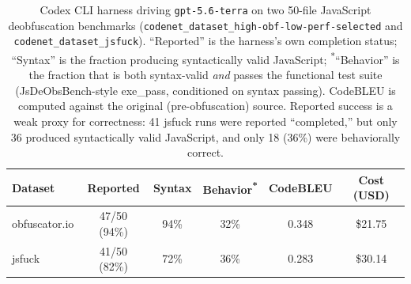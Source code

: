 
\begin{table}[h]
  \centering
  \small
  \begin{tabular}{lccccc}
    \toprule
    Dataset & Reported & Syntax & Behavior\textsuperscript{*} & CodeBLEU & Cost (USD) \\
    \midrule
    obfuscator.io & 47/50 (94\%) & 94\% & 32\% & 0.348 & \$21.75 \\
    jsfuck        & 41/50 (82\%) & 72\% & 36\% & 0.283 & \$30.14 \\
    \bottomrule
  \end{tabular}
  \caption{%
    Codex CLI harness driving \texttt{gpt-5.6-terra} on two 50-file JavaScript
    deobfuscation benchmarks (\texttt{codenet\_dataset\_high-obf-low-perf-selected}
    and \texttt{codenet\_dataset\_jsfuck}). ``Reported'' is the harness's own
    completion status; ``Syntax'' is the fraction producing syntactically valid
    JavaScript; \textsuperscript{*}``Behavior'' is the fraction that is both
    syntax-valid \emph{and} passes the functional test suite (JsDeObsBench-style
    exe\_pass, conditioned on syntax passing). CodeBLEU is computed against the
    original (pre-obfuscation) source. Reported success is a weak proxy for
    correctness: 41 jsfuck runs were reported ``completed,'' but only 36
    produced syntactically valid JavaScript, and only 18 (36\%) were
    behaviorally correct.
  }
  \label{tab:rq1-codex-gpt56terra}
\end{table}

